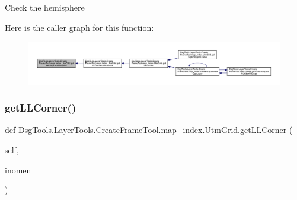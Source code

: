 \begin{DoxyVerb}Check the hemisphere
\end{DoxyVerb}
 Here is the caller graph for this function\+:
\nopagebreak
\begin{figure}[H]
\begin{center}
\leavevmode
\includegraphics[width=350pt]{class_dsg_tools_1_1_layer_tools_1_1_create_frame_tool_1_1map__index_1_1_utm_grid_ae505e6ba649d2dff7573438196cd8f5e_icgraph}
\end{center}
\end{figure}
\mbox{\label{class_dsg_tools_1_1_layer_tools_1_1_create_frame_tool_1_1map__index_1_1_utm_grid_a90dcecfe55cce7c83d38fbf95c05af0b}} 
\subsubsection{\texorpdfstring{get\+L\+L\+Corner()}{getLLCorner()}}
{\footnotesize\ttfamily def Dsg\+Tools.\+Layer\+Tools.\+Create\+Frame\+Tool.\+map\+\_\+index.\+Utm\+Grid.\+get\+L\+L\+Corner (\begin{DoxyParamCaption}\item[{}]{self,  }\item[{}]{inomen }\end{DoxyParamCaption})}

